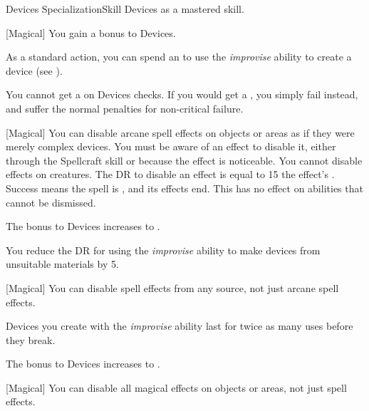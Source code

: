     \begin{feat}{Devices Specialization}{Skill}
        \featpre Devices as a mastered skill.

        [Magical] You gain a  bonus to Devices.

         As a standard action, you can spend an  to use the \textit{improvise} ability to create a device (see ).

         You cannot get a  on Devices checks.
        If you would get a , you simply fail instead, and suffer the normal penalties for non-critical failure.

        [Magical] You can disable arcane spell effects on objects or areas as if they were merely complex devices.
        You must be aware of an effect to disable it, either through the Spellcraft skill or because the effect is noticeable.
        You cannot disable effects on creatures.
        The DR to disable an effect is equal to 15 \add the effect's .
        Success means the spell is , and its effects end.
        This has no effect on abilities that cannot be dismissed.

         The bonus to Devices increases to .

         You reduce the DR for using the \textit{improvise} ability to make devices from unsuitable materials by 5.

        [Magical] You can disable spell effects from any source, not just arcane spell effects.

         Devices you create with the \textit{improvise} ability last for twice as many uses before they break.

         The bonus to Devices increases to .

        [Magical] You can disable all magical effects on objects or areas, not just spell effects.
    \end{feat}

